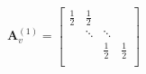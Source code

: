 \begin{equation}
\mathbf{A}_v^{(1)} =
\left[
    \begin{smallmatrix}
        \frac{1}{2} & \frac{1}{2} &  &    \\
        & \ddots & \ddots &    \\
                  & &\frac{1}{2} &\frac{1}{2}    \\
    \end{smallmatrix}
\right]
\end{equation}
